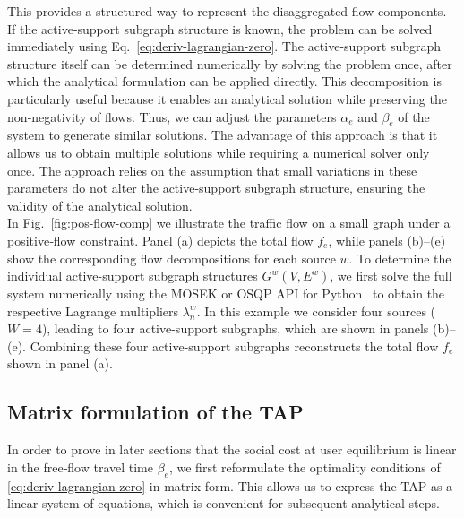 \documentclass[twocolumn,english,groupedaddress, superscriptaddress,aps,pre,10pt,floatfix]{revtex4-2}
\begin{document}
This provides a structured way to represent the disaggregated flow components. If the active-support subgraph structure is known, the problem can be solved immediately using Eq.~\ref{eq:deriv-lagrangian-zero}. The active-support subgraph structure itself can be determined numerically by solving the problem once, after which the analytical formulation can be applied directly. This decomposition is particularly useful because it enables an analytical solution while preserving the non‑negativity of flows.
Thus, we can adjust the parameters $\alpha_e$ and $\beta_e$ of the system to generate similar solutions. The advantage of this approach is that it allows us to obtain multiple solutions while requiring a numerical solver only once.
The approach relies on the assumption that small variations in these parameters do not alter the active-support subgraph structure, ensuring the validity of the analytical solution.\\

In Fig.~\ref{fig:pos-flow-comp} we illustrate the traffic flow on a small graph under a positive‑flow constraint. Panel (a) depicts the total flow $f_e$, while panels (b)–(e) show the corresponding flow decompositions for each source $w$. To determine the individual active-support subgraph structures $G^{w}(V,E^{w})$, we first solve the full system numerically using the MOSEK or OSQP API for Python~\cite{mosek,stellato2020osqp} to obtain the respective Lagrange multipliers $\lambda_n^{w}$. In this example we consider four sources ($W=4$), leading to four active-support subgraphs, which are shown in panels (b)–(e). Combining these four active-support subgraphs reconstructs the total flow $f_e$ shown in panel (a).\\

\subsection{Matrix formulation of the TAP}

In order to prove in later sections that the social cost at user equilibrium is linear in the free‑flow travel time $\beta_e$, we first reformulate the optimality conditions of \cref{eq:deriv-lagrangian-zero} in matrix form. This allows us to express the TAP as a linear system of equations, which is convenient for subsequent analytical steps.
\end{document}
